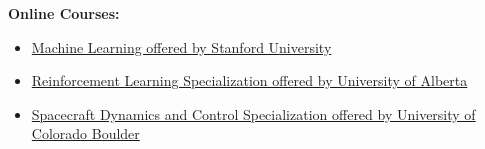 \documentclass[11pt,a4paper, sans]{moderncv}
\begin{document}
	\textbf{Online Courses:}
	\begin{itemize}
		\item \href{https://coursera.org/verify/BCTCN2JXRGRD} {Machine Learning offered by Stanford University} 
		\item \href{https://coursera.org/verify/specialization/DHSXE3N9K4FL} {Reinforcement Learning Specialization offered by University of Alberta}%
		\item \href{https://coursera.org/verify/specialization/JUZXB4A8MCKZ} {Spacecraft Dynamics and Control Specialization offered by University of Colorado Boulder}%
	\end{itemize}
	\vspace{5pt}
	\vspace{5pt}
\end{document}
